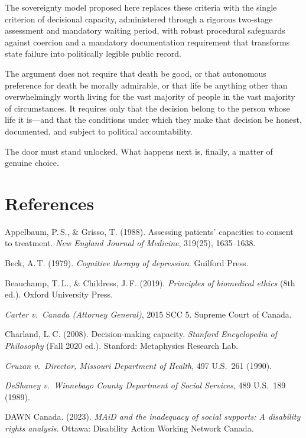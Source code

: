 \documentclass[11pt, letterpaper]{article}
\begin{document}
The sovereignty model proposed here replaces these criteria with the single criterion
of decisional capacity, administered through a rigorous two-stage assessment and
mandatory waiting period, with robust procedural safeguards against coercion and a
mandatory documentation requirement that transforms state failure into politically
legible public record.

The argument does not require that death be good, or that autonomous preference for
death be morally admirable, or that life be anything other than overwhelmingly worth
living for the vast majority of people in the vast majority of circumstances. It
requires only that the decision belong to the person whose life it is---and that the
conditions under which they make that decision be honest, documented, and subject to
political accountability.

The door must stand unlocked. What happens next is, finally, a matter of genuine choice.

\bigskip
\section*{References}
\setlength{\parskip}{5pt}
\setlength{\parindent}{0pt}
\small

Appelbaum, P.\,S., \& Grisso, T. (1988). Assessing patients' capacities to consent to
treatment. \textit{New England Journal of Medicine}, 319(25), 1635--1638.

Beck, A.\,T. (1979). \textit{Cognitive therapy of depression}. Guilford Press.

Beauchamp, T.\,L., \& Childress, J.\,F. (2019). \textit{Principles of biomedical ethics}
(8th ed.). Oxford University Press.

\textit{Carter v.\ Canada (Attorney General)}, 2015 SCC 5. Supreme Court of Canada.

Charland, L.\,C. (2008). Decision-making capacity.
\textit{Stanford Encyclopedia of Philosophy} (Fall 2020 ed.).
Stanford: Metaphysics Research Lab.

\textit{Cruzan v.\ Director, Missouri Department of Health}, 497 U.S.\ 261 (1990).

\textit{DeShaney v.\ Winnebago County Department of Social Services}, 489 U.S.\ 189 (1989).

DAWN Canada. (2023). \textit{MAiD and the inadequacy of social supports:
A disability rights analysis}. Ottawa: Disability Action Working Network Canada.
\end{document}
